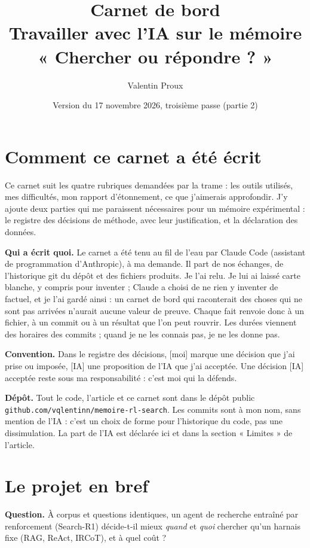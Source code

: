 \documentclass[10pt,a4paper]{article}
\title{Carnet de bord\\[2pt]\large Travailler avec l'IA sur le mémoire « Chercher ou répondre ? »}
\author{Valentin Proux}
\date{Version du 17 novembre 2026, troisième passe (partie 2)}
\newcommand{\f}[1]{\texttt{\small #1}}
\newcommand{\ia}{\textcolor{blue!60!black}{\textsf{\small[IA]}}}
\newcommand{\moi}{\textcolor{green!45!black}{\textsf{\small[moi]}}}
\begin{document}
\maketitle

\section*{Comment ce carnet a été écrit}

Ce carnet suit les quatre rubriques demandées par la trame : les outils utilisés, mes difficultés, mon rapport d'étonnement, ce que j'aimerais approfondir. J'y ajoute deux parties qui me paraissent nécessaires pour un mémoire expérimental : le registre des décisions de méthode, avec leur justification, et la déclaration des données.

\textbf{Qui a écrit quoi.} Le carnet a été tenu au fil de l'eau par Claude Code (assistant de programmation d'Anthropic), à ma demande. Il part de nos échanges, de l'historique git du dépôt et des fichiers produits. Je l'ai relu. Je lui ai laissé carte blanche, y compris pour inventer ; Claude a choisi de ne rien y inventer de factuel, et je l'ai gardé ainsi : un carnet de bord qui raconterait des choses qui ne sont pas arrivées n'aurait aucune valeur de preuve. Chaque fait renvoie donc à un fichier, à un commit ou à un résultat que l'on peut rouvrir. Les durées viennent des horaires des commits ; quand je ne les connais pas, je ne les donne pas.

\textbf{Convention.} Dans le registre des décisions, \moi{} marque une décision que j'ai prise ou imposée, \ia{} une proposition de l'IA que j'ai acceptée. Une décision \ia{} acceptée reste sous ma responsabilité : c'est moi qui la défends.

\textbf{Dépôt.} Tout le code, l'article et ce carnet sont dans le dépôt public \f{github.com/vqlentinn/memoire-rl-search}. Les commits sont à mon nom, sans mention de l'IA : c'est un choix de forme pour l'historique du code, pas une dissimulation. La part de l'IA est déclarée ici et dans la section « Limites » de l'article.

\tableofcontents

\section{Le projet en bref}

\textbf{Question.} À corpus et questions identiques, un agent de recherche entraîné par renforcement (Search-R1) décide-t-il mieux \emph{quand} et \emph{quoi} chercher qu'un harnais fixe (RAG, ReAct, IRCoT), et à quel coût ?
\end{document}
